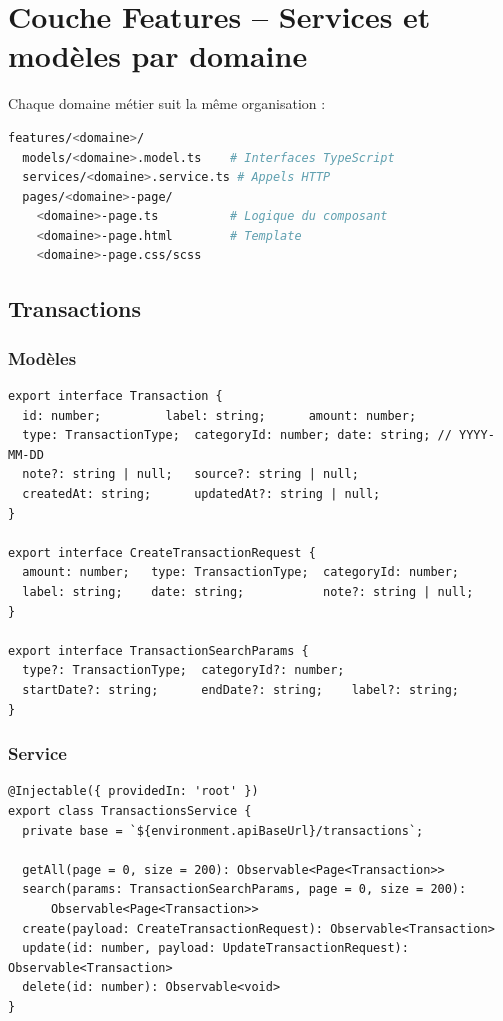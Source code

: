 \documentclass[12pt,a4paper]{article}
\begin{document}
\section{Couche Features -- Services et modèles par domaine}

Chaque domaine métier suit la même organisation :
\begin{lstlisting}[language=bash, numbers=none, frame=none, backgroundcolor=\color{codebg}, basicstyle=\ttfamily\small\color{codefg}]
features/<domaine>/
  models/<domaine>.model.ts    # Interfaces TypeScript
  services/<domaine>.service.ts # Appels HTTP
  pages/<domaine>-page/
    <domaine>-page.ts          # Logique du composant
    <domaine>-page.html        # Template
    <domaine>-page.css/scss
\end{lstlisting}

\subsection{Transactions}

\subsubsection{Modèles}

\begin{lstlisting}
export interface Transaction {
  id: number;         label: string;      amount: number;
  type: TransactionType;  categoryId: number; date: string; // YYYY-MM-DD
  note?: string | null;   source?: string | null;
  createdAt: string;      updatedAt?: string | null;
}

export interface CreateTransactionRequest {
  amount: number;   type: TransactionType;  categoryId: number;
  label: string;    date: string;           note?: string | null;
}

export interface TransactionSearchParams {
  type?: TransactionType;  categoryId?: number;
  startDate?: string;      endDate?: string;    label?: string;
}
\end{lstlisting}

\subsubsection{Service}

\begin{lstlisting}
@Injectable({ providedIn: 'root' })
export class TransactionsService {
  private base = `${environment.apiBaseUrl}/transactions`;

  getAll(page = 0, size = 200): Observable<Page<Transaction>>
  search(params: TransactionSearchParams, page = 0, size = 200):
      Observable<Page<Transaction>>
  create(payload: CreateTransactionRequest): Observable<Transaction>
  update(id: number, payload: UpdateTransactionRequest): Observable<Transaction>
  delete(id: number): Observable<void>
}
\end{lstlisting}
\end{document}
